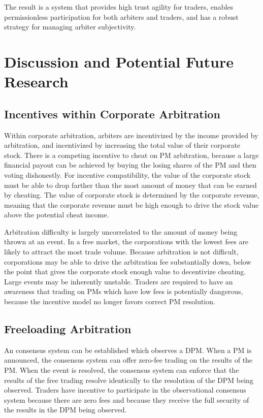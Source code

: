 \documentclass[onecolumn]{article}
\begin{document}
The result is a system that provides high trust agility for traders, enables permissionless participation for both arbiters and traders, and has a robust strategy for managing arbiter subjectivity.

\section{Discussion and Potential Future Research}

\subsection{Incentives within Corporate Arbitration}
Within corporate arbitration, arbiters are incentivized by the income provided by arbitration, and incentivized by increasing the total value of their corporate stock.
There is a competing incentive to cheat on PM arbitration, because a large financial payout can be achieved by buying the losing shares of the PM and then voting dishonestly.
For incentive compatibility, the value of the corporate stock must be able to drop farther than the most amount of money that can be earned by cheating.
The value of corporate stock is determined by the corporate revenue, meaning that the corporate revenue must be high enough to drive the stock value above the potential cheat income.

Arbitration difficulty is largely uncorrelated to the amount of money being thrown at an event.
In a free market, the corporations with the lowest fees are likely to attract the most trade volume.
Because arbitration is not difficult, corporations may be able to drive the arbitration fee substantially down, below the point that gives the corporate stock enough value to decentivize cheating.
Large events may be inherently unstable.
Traders are required to have an awareness that trading on PMs which have low fees is potentially dangerous, because the incentive model no longer favors correct PM resolution.

\subsection{Freeloading Arbitration}
An consensus system can be established which observes a DPM.
When a PM is announced, the consensus system can offer zero-fee trading on the results of the PM.
When the event is resolved, the consensus system can enforce that the results of the free trading resolve identically to the resolution of the DPM being observed.
Traders have incentive to participate in the observational consensus system because there are zero fees and because they receive the full security of the results in the DPM being observed.
\end{document}

